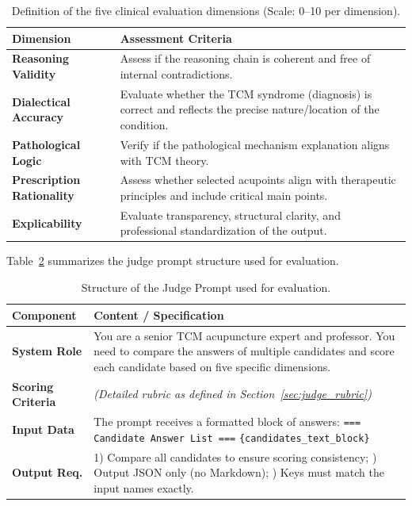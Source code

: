 \documentclass[preprint,5p,times,twocolumn,fleqn]{elsarticle}
\begin{document}
\begin{table}[htbpt]
  \centering
  \small
  \renewcommand{\arraystretch}{1.20}
  \setlength{\tabcolsep}{6pt}
  \caption{Definition of the five clinical evaluation dimensions (Scale: 0--10 per dimension).}
  \label{tab:scoring_rubric}
  \begin{tabularx}{\textwidth}{@{} >{\bfseries}l X @{}}
    \toprule
    \textbf{Dimension} & \textbf{Assessment Criteria} \\
    \midrule
    Reasoning Validity & Assess if the reasoning chain is coherent and free of internal contradictions. \\
    Dialectical Accuracy & Evaluate whether the TCM syndrome (diagnosis) is correct and reflects the precise nature/location of the condition. \\
    Pathological Logic & Verify if the pathological mechanism explanation aligns with TCM theory. \\
    Prescription Rationality & Assess whether selected acupoints align with therapeutic principles and include critical main points. \\
    Explicability & Evaluate transparency, structural clarity, and professional standardization of the output. \\
    \bottomrule
  \end{tabularx}
\end{table}

Table~\ref{tab:judge_prompt_structure} summarizes the judge prompt structure used for evaluation.

\begin{table}[htbpt]
  \centering
  \small
  \renewcommand{\arraystretch}{1.20}
  \setlength{\tabcolsep}{6pt}
  \caption{Structure of the Judge Prompt used for evaluation.}
  \label{tab:judge_prompt_structure}
  \begin{tabularx}{\textwidth}{@{}l X@{}}
    \toprule
    \textbf{Component} & \textbf{Content / Specification} \\
    \midrule
    \textbf{System Role} & You are a senior TCM acupuncture expert and professor. You need to compare the answers of multiple candidates and score each candidate based on five specific dimensions. \\
    \textbf{Scoring Criteria} & \textit{(Detailed rubric as defined in Section~\ref{sec:judge_rubric})} \\
    \textbf{Input Data} & The prompt receives a formatted block of answers: \newline
    \texttt{=== Candidate Answer List ===} \newline
    \texttt{\{candidates\_text\_block\}} \\
    \textbf{Output Req.} & 1) Compare all candidates to ensure scoring consistency; \newline
    2) Output JSON only (no Markdown); \newline
    3) Keys must match the input names exactly. \\
    \bottomrule
  \end{tabularx}
\end{table}
\end{document}
